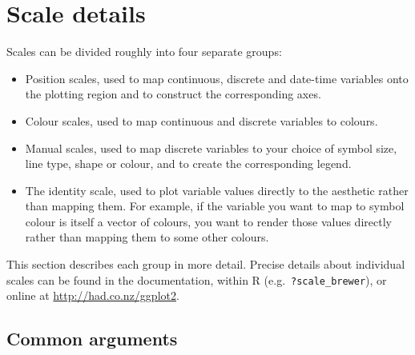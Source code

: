 % 

\section{Scale details}
\label{sec:scale-details}

Scales can be divided roughly into four separate groups:

\begin{itemize}
  \item Position scales, used to map continuous, discrete and date-time variables onto the plotting region and to construct the corresponding axes.

  \item Colour scales, used to map continuous and discrete variables to colours.

  \item Manual scales, used to map discrete variables to your choice of symbol size, line type, shape or colour, and to create the corresponding legend.

  \item The identity scale, used to plot variable values directly to the aesthetic rather than mapping them.  For example, if the variable you want to map to symbol colour is itself a vector of colours, you want to render those values directly rather than mapping them to some other colours.

\end{itemize}

\noindent  This section describes each group in more detail.  Precise details about individual scales can be found in the documentation, within R (e.g.\ {\tt ?scale\_brewer}), or online at  \url{http://had.co.nz/ggplot2}.  

\subsection{Common arguments}
\label{sub:scale-arguments}

